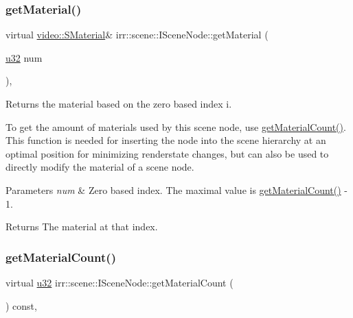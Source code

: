 \subsubsection{\texorpdfstring{get\+Material()}{getMaterial()}\hspace{0.1cm}{\footnotesize\ttfamily [2/2]}}
{\footnotesize\ttfamily virtual \hyperlink{classirr_1_1video_1_1SMaterial}{video\+::\+S\+Material}\& irr\+::scene\+::\+I\+Scene\+Node\+::get\+Material (\begin{DoxyParamCaption}\item[{\hyperlink{namespaceirr_a0416a53257075833e7002efd0a18e804}{u32}}]{num }\end{DoxyParamCaption})\hspace{0.3cm}{\ttfamily [inline]}, {\ttfamily [virtual]}}



Returns the material based on the zero based index i. 

To get the amount of materials used by this scene node, use \hyperlink{classirr_1_1scene_1_1ISceneNode_a8e75e9baede63e31e6aa6e42e6c8ddfe}{get\+Material\+Count()}. This function is needed for inserting the node into the scene hierarchy at an optimal position for minimizing renderstate changes, but can also be used to directly modify the material of a scene node. 
\begin{DoxyParams}{Parameters}
{\em num} & Zero based index. The maximal value is \hyperlink{classirr_1_1scene_1_1ISceneNode_a8e75e9baede63e31e6aa6e42e6c8ddfe}{get\+Material\+Count()} -\/ 1. \\
\hline
\end{DoxyParams}
\begin{DoxyReturn}{Returns}
The material at that index. 
\end{DoxyReturn}
\mbox{\label{classirr_1_1scene_1_1ISceneNode_a8e75e9baede63e31e6aa6e42e6c8ddfe}} 
\subsubsection{\texorpdfstring{get\+Material\+Count()}{getMaterialCount()}\hspace{0.1cm}{\footnotesize\ttfamily [1/2]}}
{\footnotesize\ttfamily virtual \hyperlink{namespaceirr_a0416a53257075833e7002efd0a18e804}{u32} irr\+::scene\+::\+I\+Scene\+Node\+::get\+Material\+Count (\begin{DoxyParamCaption}{ }\end{DoxyParamCaption}) const\hspace{0.3cm}{\ttfamily [inline]}, {\ttfamily [virtual]}}



